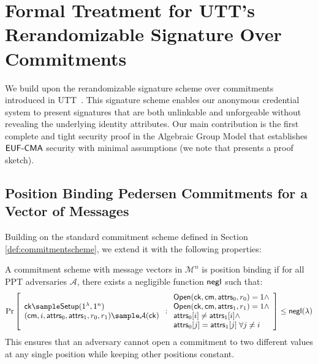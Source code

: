\section{Formal Treatment for UTT's Rerandomizable Signature Over Commitments}\label{sec:formal_treatment_utt_rerand_sig}
We build upon the rerandomizable signature scheme over commitments introduced in UTT~\cite{tomescu_utt_2022}. This signature scheme enables our anonymous credential system to present signatures that are both unlinkable and unforgeable without revealing the underlying identity attributes. Our main contribution is the first complete and tight security proof in the Algebraic Group Model that establishes $\mathsf{EUF\text{-}CMA}$ security with minimal assumptions (we note that \cite{tomescu_utt_2022} presents a proof sketch).




\subsection{Position Binding Pedersen Commitments for a Vector of Messages}

Building on the standard commitment scheme defined in Section \ref{def:commitmentscheme}, we extend it with the following properties:


\begin{definition}
A commitment scheme with message vectors in $\mathcal{M}^n$ is position binding if for all PPT adversaries $\mathcal{A}$, there exists a negligible function $\mathsf{negl}$ such that:
\[
    \Pr
    \left[
        \begin{array}{l}
        \mathsf{ck} \sample \mathsf{Setup}(1^\lambda, 1^n) \\
        (\mathsf{cm}, i, \attrs_0, \attrs_1, r_0, r_1) \sample \mathcal{A}(\mathsf{ck}) 
        \end{array}
        : \begin{array}{l}
            \mathsf{Open}(\mathsf{ck}, \mathsf{cm}, \attrs_0, r_0) = 1 \land \\
            \mathsf{Open}(\mathsf{ck}, \mathsf{cm}, \attrs_1, r_1) = 1 \land \\
            \attrs_0[i] \neq \attrs_1[i] \land \\
            \attrs_0[j] = \attrs_1[j] \; \forall j \neq i
          \end{array}
    \right] \leq \negl(\lambda)
\]
This ensures that an adversary cannot open a commitment to two different values at any single position while keeping other positions constant.
\end{definition}


